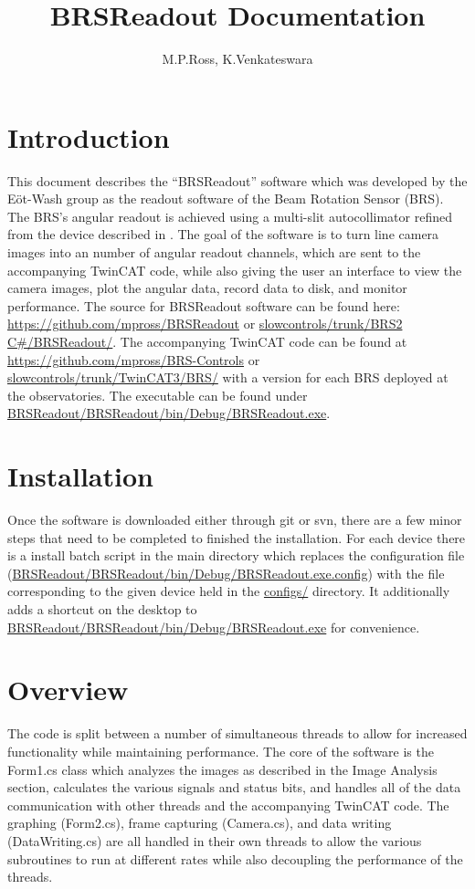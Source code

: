 \documentclass{article}
\title{BRSReadout Documentation}
\author{M.P.Ross, K.Venkateswara}
\begin{document}
\maketitle
\section{Introduction}
This document describes the ``BRSReadout'' software which was developed by the E{\"o}t-Wash group as the readout software of the Beam Rotation Sensor (BRS). The BRS's angular readout is achieved using a multi-slit autocollimator refined from the device described in \cite{autoCol}. The goal of the software is to turn line camera images into an number of angular readout channels, which are sent to the accompanying TwinCAT code, while also giving the user an interface to view the camera images, plot the angular data, record data to disk, and monitor performance. The source for BRSReadout software can be found here: \url{https://github.com/mpross/BRSReadout} or \url{slowcontrols/trunk/BRS2 C#/BRSReadout/}. The accompanying TwinCAT code can be found at \url{https://github.com/mpross/BRS-Controls} or \url{slowcontrols/trunk/TwinCAT3/BRS/}  with a version for each BRS deployed at the observatories. The executable can be found under \url{BRSReadout/BRSReadout/bin/Debug/BRSReadout.exe}.
\section{Installation}
Once the software is downloaded either through git or svn, there are a few minor steps that need to be completed to finished the installation. For each device there is a install batch script in the main directory which replaces the configuration file (\url{BRSReadout/BRSReadout/bin/Debug/BRSReadout.exe.config}) with the file corresponding to the given device held in the \url{configs/} directory. It additionally adds a shortcut on the desktop to \url{BRSReadout/BRSReadout/bin/Debug/BRSReadout.exe} for convenience.
\section{Overview}
The code is split between a number of simultaneous threads to allow for increased functionality while maintaining performance. The core of the software is the Form1.cs class which analyzes the images as described in the Image Analysis section, calculates the various signals and status bits, and handles all of the data communication with other threads and the accompanying TwinCAT code. The graphing (Form2.cs), frame capturing (Camera.cs), and data writing (DataWriting.cs) are all handled in their own threads to allow the various subroutines to run at different rates while also decoupling the performance of the threads.
\end{document}
